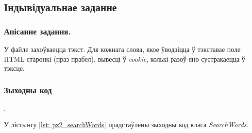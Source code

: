 

\vspace{-\baselineskip}
\subsection{Індывідуальнае заданне}

\subsubsection{Апісанне задання.}

У файле захоўваецца тэкст.
Для кожнага слова, якое ўводзіцца ў тэкставае поле HTML-старонкі (праз
прабел), вывесці ў \textit{cookie}, колькі разоў яно сустракаецца
ў тэксце.

\subsubsection{Зыходны код}.

У лістынгу \ref{lst: pz2_searchWords} прадстаўлены зыходны код класа \textit{SearchWords}.


